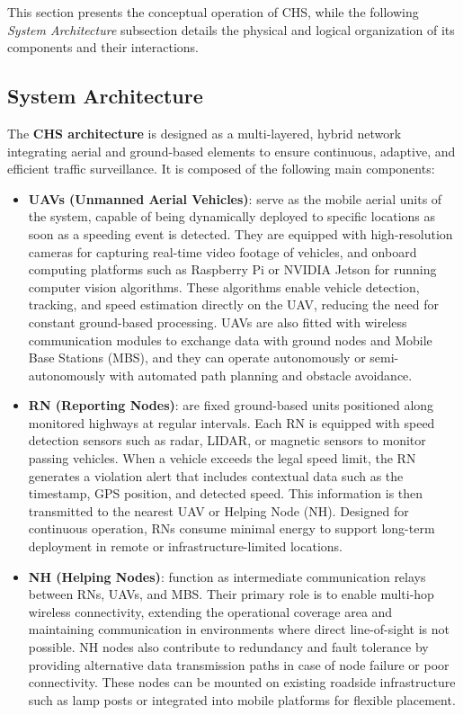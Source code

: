 This section presents the conceptual operation of CHS, while the following \textit{System Architecture} subsection details the physical and logical organization of its components and their interactions.

\subsection{System Architecture}

The \textbf{CHS architecture} is designed as a multi-layered, hybrid network integrating aerial and ground-based elements to ensure continuous, adaptive, and efficient traffic surveillance. It is composed of the following main components:

\begin{itemize}
    \item \textbf{UAVs (Unmanned Aerial Vehicles)}: serve as the mobile aerial units of the system, capable of being dynamically deployed to specific locations as soon as a speeding event is detected. They are equipped with high-resolution cameras for capturing real-time video footage of vehicles, and onboard computing platforms such as Raspberry Pi or NVIDIA Jetson for running computer vision algorithms. These algorithms enable vehicle detection, tracking, and speed estimation directly on the UAV, reducing the need for constant ground-based processing. UAVs are also fitted with wireless communication modules to exchange data with ground nodes and Mobile Base Stations (MBS), and they can operate autonomously or semi-autonomously with automated path planning and obstacle avoidance.
    \item \textbf{RN (Reporting Nodes)}:  are fixed ground-based units positioned along monitored highways at regular intervals. Each RN is equipped with speed detection sensors such as radar, LIDAR, or magnetic sensors to monitor passing vehicles. When a vehicle exceeds the legal speed limit, the RN generates a violation alert that includes contextual data such as the timestamp, GPS position, and detected speed. This information is then transmitted to the nearest UAV or Helping Node (NH). Designed for continuous operation, RNs consume minimal energy to support long-term deployment in remote or infrastructure-limited locations.
    \item \textbf{NH (Helping Nodes)}: function as intermediate communication relays between RNs, UAVs, and MBS. Their primary role is to enable multi-hop wireless connectivity, extending the operational coverage area and maintaining communication in environments where direct line-of-sight is not possible. NH nodes also contribute to redundancy and fault tolerance by providing alternative data transmission paths in case of node failure or poor connectivity. These nodes can be mounted on existing roadside infrastructure such as lamp posts or integrated into mobile platforms for flexible placement.

\end{itemize}
